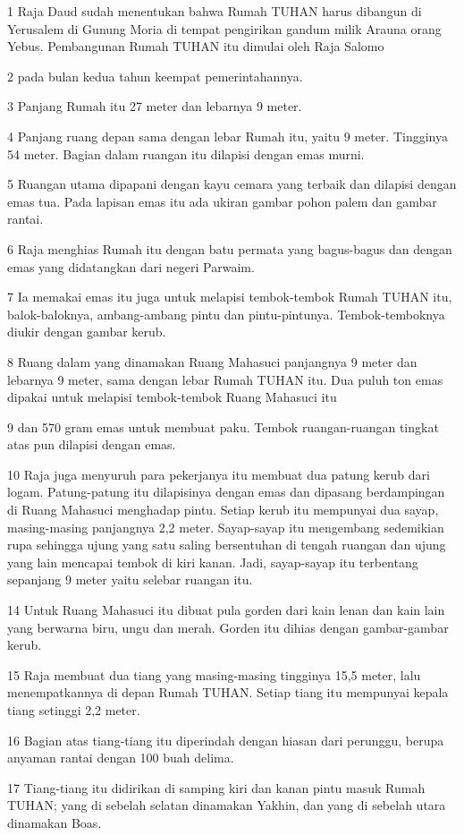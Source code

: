 \par 1 Raja Daud sudah menentukan bahwa Rumah TUHAN harus dibangun di Yerusalem di Gunung Moria di tempat pengirikan gandum milik Arauna orang Yebus. Pembangunan Rumah TUHAN itu dimulai oleh Raja Salomo
\par 2 pada bulan kedua tahun keempat pemerintahannya.
\par 3 Panjang Rumah itu 27 meter dan lebarnya 9 meter.
\par 4 Panjang ruang depan sama dengan lebar Rumah itu, yaitu 9 meter. Tingginya 54 meter. Bagian dalam ruangan itu dilapisi dengan emas murni.
\par 5 Ruangan utama dipapani dengan kayu cemara yang terbaik dan dilapisi dengan emas tua. Pada lapisan emas itu ada ukiran gambar pohon palem dan gambar rantai.
\par 6 Raja menghias Rumah itu dengan batu permata yang bagus-bagus dan dengan emas yang didatangkan dari negeri Parwaim.
\par 7 Ia memakai emas itu juga untuk melapisi tembok-tembok Rumah TUHAN itu, balok-baloknya, ambang-ambang pintu dan pintu-pintunya. Tembok-temboknya diukir dengan gambar kerub.
\par 8 Ruang dalam yang dinamakan Ruang Mahasuci panjangnya 9 meter dan lebarnya 9 meter, sama dengan lebar Rumah TUHAN itu. Dua puluh ton emas dipakai untuk melapisi tembok-tembok Ruang Mahasuci itu
\par 9 dan 570 gram emas untuk membuat paku. Tembok ruangan-ruangan tingkat atas pun dilapisi dengan emas.
\par 10 Raja juga menyuruh para pekerjanya itu membuat dua patung kerub dari logam. Patung-patung itu dilapisinya dengan emas dan dipasang berdampingan di Ruang Mahasuci menghadap pintu. Setiap kerub itu mempunyai dua sayap, masing-masing panjangnya 2,2 meter. Sayap-sayap itu mengembang sedemikian rupa sehingga ujung yang satu saling bersentuhan di tengah ruangan dan ujung yang lain mencapai tembok di kiri kanan. Jadi, sayap-sayap itu terbentang sepanjang 9 meter yaitu selebar ruangan itu.
\par 14 Untuk Ruang Mahasuci itu dibuat pula gorden dari kain lenan dan kain lain yang berwarna biru, ungu dan merah. Gorden itu dihias dengan gambar-gambar kerub.
\par 15 Raja membuat dua tiang yang masing-masing tingginya 15,5 meter, lalu menempatkannya di depan Rumah TUHAN. Setiap tiang itu mempunyai kepala tiang setinggi 2,2 meter.
\par 16 Bagian atas tiang-tiang itu diperindah dengan hiasan dari perunggu, berupa anyaman rantai dengan 100 buah delima.
\par 17 Tiang-tiang itu didirikan di samping kiri dan kanan pintu masuk Rumah TUHAN; yang di sebelah selatan dinamakan Yakhin, dan yang di sebelah utara dinamakan Boas.

